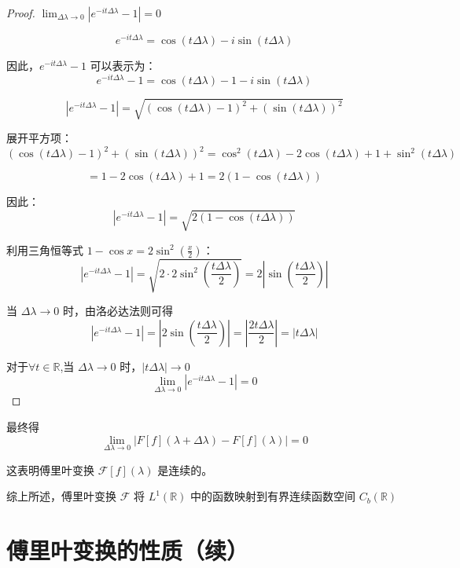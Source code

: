 \documentclass[12pt,a4paper]{article}
\theoremstyle{plain}
\theoremstyle{definition}
\theoremstyle{remark}
\begin{document}
\begin{proof}	$ \lim_{\Delta \lambda \to 0} |e^{-it\Delta \lambda} - 1| = 0 $

	
	\[ e^{-it\Delta \lambda} = \cos(t \Delta \lambda) - i \sin(t \Delta \lambda) \]
	
	因此，\(e^{-it\Delta \lambda} - 1\) 可以表示为：
	\[ e^{-it\Delta \lambda} - 1 = \cos(t \Delta \lambda) - 1 - i \sin(t \Delta \lambda) \]
	
	\[ |e^{-it\Delta \lambda} - 1| = \sqrt{(\cos(t \Delta \lambda) - 1)^2 + (\sin(t \Delta \lambda))^2} \]
	
	展开平方项：
	\[ (\cos(t \Delta \lambda) - 1)^2 + (\sin(t \Delta \lambda))^2 = \cos^2(t \Delta \lambda) - 2 \cos(t \Delta \lambda) + 1 + \sin^2(t \Delta \lambda) \]
	
	\[ = 1 - 2 \cos(t \Delta \lambda) + 1 = 2(1 - \cos(t \Delta \lambda)) \]
	
	因此：
	\[ |e^{-it\Delta \lambda} - 1| = \sqrt{2(1 - \cos(t \Delta \lambda))} \]
	
	利用三角恒等式 \(1 - \cos x = 2 \sin^2\left(\frac{x}{2}\right)\)：
	\[ |e^{-it\Delta \lambda} - 1| = \sqrt{2 \cdot 2 \sin^2\left(\frac{t \Delta \lambda}{2}\right)} = 2 \left|\sin\left(\frac{t \Delta \lambda}{2}\right)\right| \]
	
	当 \(\Delta \lambda \to 0\) 时，由洛必达法则可得
	\[|e^{-it\Delta \lambda} - 1|= \left|2\sin\left(\frac{t \Delta \lambda}{2}\right)\right| = \left|\frac{2t \Delta \lambda}{2}\right|= |t \Delta \lambda| \]
	
	
	对于$\forall t\in \mathbb{R}$,当 \(\Delta \lambda \to 0\) 时，\(|t \Delta \lambda| \to 0\)
	\[ \lim_{\Delta \lambda \to 0} |e^{-it\Delta \lambda} - 1| = 0 \]
	
\end{proof}

最终得
\[ \lim_{\Delta \lambda \to 0} |F[f](\lambda + \Delta \lambda) - F[f](\lambda)| = 0 \]

这表明傅里叶变换 \(\mathcal{F}[f](\lambda)\) 是连续的。

综上所述，傅里叶变换 \(\mathcal{F}\) 将 \( L^1(\mathbb{R}) \) 中的函数映射到有界连续函数空间 \( C_b(\mathbb{R}) \)
	
	\section{傅里叶变换的性质（续）}
	
\end{document}
